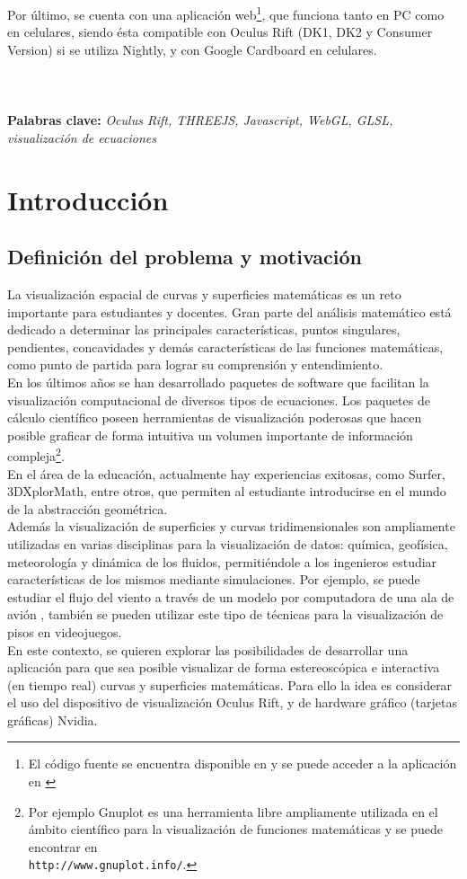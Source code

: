 \documentclass[12pt]{article}
\begin{document}
Por último, se cuenta con una aplicación web\footnote{El código fuente se encuentra disponible en \cite{nuestrocodigo} y se puede acceder a la aplicación en \cite{nuestrositio}}, que funciona  tanto en PC como en celulares, siendo ésta compatible con Oculus Rift (DK1, DK2 y Consumer Version) si se utiliza Nightly, y con Google Cardboard en celulares.
\\
\\
\\
\\
\textbf{Palabras clave:} \textit{Oculus Rift, THREEJS, Javascript, WebGL, GLSL, visualización de ecuaciones} 


\clearpage
\tableofcontents
\clearpage
\section{Introducción}

\subsection{Definición del problema y motivación}
La visualización espacial de curvas y superficies matemáticas es un reto importante para estudiantes y docentes. Gran parte del análisis matemático está dedicado a determinar las principales características, puntos singulares, pendientes, concavidades y demás características de las  funciones matemáticas, como punto de partida para lograr su comprensión y entendimiento.
\\En los últimos años se han desarrollado paquetes de software que facilitan la visualización computacional de diversos tipos de ecuaciones. Los paquetes de cálculo científico poseen herramientas de visualización poderosas que hacen posible graficar de forma intuitiva un volumen importante de información compleja\footnote{Por ejemplo Gnuplot es una herramienta libre ampliamente utilizada en el ámbito científico para la visualización de funciones matemáticas y se puede encontrar en \\\texttt{http://www.gnuplot.info/}\cite{gnuplot}.}.  
\\En el área de la educación, actualmente hay experiencias exitosas, como Surfer\cite{surfer}, 3DXplorMath\cite{dxplormath}, entre otros, que permiten al estudiante introducirse en el mundo de la abstracción geométrica. 
\\Además la visualización de superficies y curvas tridimensionales son ampliamente utilizadas en varias disciplinas para la visualización de datos: química, geofísica, meteorología y dinámica de los fluidos, permitiéndole a los ingenieros estudiar características de los mismos mediante simulaciones. Por ejemplo, se puede estudiar el flujo del viento a través de un modelo por computadora de una ala de avión \cite{aircraftwing}, también se pueden utilizar este tipo de técnicas para la visualización de pisos en videojuegos\cite{realtimerendering}\cite{engine}.
\\En este contexto, se quieren explorar las posibilidades de desarrollar una aplicación para que sea posible visualizar de forma estereoscópica e interactiva (en tiempo real) curvas y superficies matemáticas. Para ello la idea es considerar el uso del dispositivo de visualización Oculus Rift, y de hardware gráfico (tarjetas gráficas) Nvidia.
\end{document}
